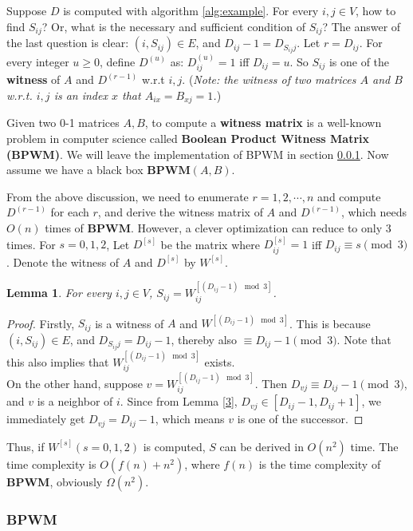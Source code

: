 \documentclass[11pt]{article}
\theoremstyle{plain}
\newtheorem{lemma}{Lemma}[section]
\begin{document}
Suppose $D$ is computed with algorithm \ref{alg:example}. For every $i,j\in V$, how to find $S_{ij}$? Or, what is the necessary and sufficient condition of $S_{ij}$? The answer of the last question is clear: $(i,S_{ij})\in E$, and $D_{ij}-1 = D_{S_{ij}j}$. Let $r=D_{ij}$. For every integer $u\ge 0$, define $D^{(u)}$ as: $D^{(u)}_{ij}=1$ iff $D_{ij}=u$. So $S_{ij}$ is one of the \textbf{witness} of $A$ and $D^{(r-1)}$ w.r.t $i,j$. (\emph{Note: the witness of two matrices $A$ and $B$ w.r.t. $i,j$ is an index $x$ that $A_{ix}=B_{xj}=1$.})

Given two 0-1 matrices $A,B$, to compute a \textbf{witness matrix} is a well-known problem in computer science called \textbf{Boolean Product Witness Matrix (BPWM)}. We will leave the implementation of BPWM in section \ref{sec:bpwm}. Now assume we have a black box $\mathbf{BPWM}(A,B)$.

From the above discussion, we need to enumerate $r=1,2,\cdots,n$ and compute $D^{(r-1)}$ for each $r$, and derive the witness matrix of $A$ and $D^{(r-1)}$, which needs $O(n)$ times of $\mathbf{BPWM}$. However, a clever optimization can reduce to only $3$ times. For $s=0,1,2$, Let $D^{[s]}$ be the matrix where $D^{[s]}_{ij}=1$ iff $D_{ij}\equiv s\pmod 3$. Denote the witness of $A$ and $D^{[s]}$ by $W^{[s]}$.

\begin{lemma}
\label{5}
For every $i,j\in V$, $S_{ij}=W^{[(D_{ij}-1)\mod 3]}_{ij}$.
\end{lemma}
\begin{proof}
Firstly, $S_{ij}$ is a witness of $A$ and $W^{[(D_{ij}-1)\mod 3]}$. This is because $(i,S_{ij})\in E$, and $D_{S_{ij}j}=D_{ij}-1$, thereby also $\equiv D_{ij}-1\pmod 3$. Note that this also implies that $W^{[(D_{ij}-1)\mod 3]}_{ij}$ exists.\\
On the other hand, suppose $v=W^{[(D_{ij}-1)\mod 3]}_{ij}$. Then $D_{vj}\equiv D_{ij}-1\pmod 3$, and $v$ is a neighbor of $i$. Since from Lemma \ref{3}, $D_{vj}\in [D_{ij}-1,D_{ij}+1]$, we immediately get $D_{vj}=D_{ij}-1$, which means $v$ is one of the successor.
\end{proof}

Thus, if $W^{[s]}(s=0,1,2)$ is computed, $S$ can be derived in $O(n^2)$ time. The time complexity is $O(f(n)+n^2)$, where $f(n)$ is the time complexity of \textbf{BPWM}, obviously $\Omega(n^2)$.

\subsubsection{BPWM}
\label{sec:bpwm}\
\end{document}
